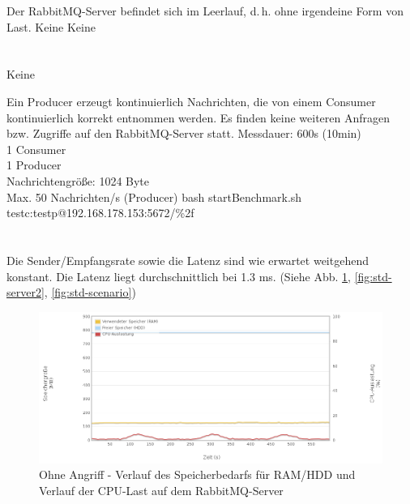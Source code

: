 \documentclass[	a4paper,
			11pt,
			titlepage,
			oneside,
			fleqn,
			listof=totoc,
			parskip,
			numbers=noenddot]{scrartcl}
\begin{document}
		{Der RabbitMQ-Server befindet sich im Leerlauf, d.\,h. ohne irgendeine Form von Last.}%
		{Keine}%
		{Keine}%
		{%
		 \\
		 \\
		 \\
		}%
		{Keine}
	
		{Ein Producer erzeugt kontinuierlich Nachrichten, die von einem Consumer kontinuierlich korrekt entnommen werden. Es finden keine weiteren Anfragen bzw. Zugriffe auf den RabbitMQ-Server statt.}%
		{%
		 Messdauer: 600s (10min)\\
		 1 Consumer \\
		 1 Producer \\
		 Nachrichtengröße: 1024 Byte\\
		 Max. 50 Nachrichten/s (Producer)
		}%
		{bash startBenchmark.sh testc:testp@192.168.178.153:5672/\%2f}%
		{%
		 \\
		 \\
		 \\
		}%
		{
		 Die Sender/Empfangsrate sowie die Latenz sind wie erwartet weitgehend konstant. Die Latenz liegt durchschnittlich bei 1.3 ms.
		 (Siehe Abb. \ref{fig:std-server1}, \ref{fig:std-server2}, \ref{fig:std-scenario})
		}
		
		\begin{figure}[!htb]
			\centering
			\includegraphics[width=\textwidth]{img/std/std_server1.png}
			\caption{Ohne Angriff - Verlauf des Speicherbedarfs für RAM/HDD und Verlauf der CPU-Last auf dem RabbitMQ-Server}
			\label{fig:std-server1}
		\end{figure}
		
\end{document}
